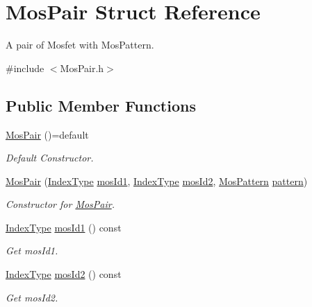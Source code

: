 \hypertarget{classMosPair}{}\section{Mos\+Pair Struct Reference}
\label{classMosPair}


A pair of Mosfet with Mos\+Pattern.  




{\ttfamily \#include $<$Mos\+Pair.\+h$>$}

\subsection*{Public Member Functions}
\begin{DoxyCompactItemize}
\item 
\hyperlink{classMosPair_ad595508e33836b1645f98d85978375c1}{Mos\+Pair} ()=default
\begin{DoxyCompactList}\small\item\em Default Constructor. \end{DoxyCompactList}\item 
\hyperlink{classMosPair_a03e4f764099652cbb0a79f7e0392c315}{Mos\+Pair} (\hyperlink{type_8h_a581e8093e28e7362f2b6937296190676}{Index\+Type} \hyperlink{classMosPair_a324d89c99656159e6882e6f9701f0efe}{mos\+Id1}, \hyperlink{type_8h_a581e8093e28e7362f2b6937296190676}{Index\+Type} \hyperlink{classMosPair_a08f2d371ecad665d546bef76c45e2665}{mos\+Id2}, \hyperlink{type_8h_af19eddb079bfea723256710b029c38e8}{Mos\+Pattern} \hyperlink{classMosPair_a342efc591b339fc9d08ad468d7399dd9}{pattern})
\begin{DoxyCompactList}\small\item\em Constructor for \hyperlink{classMosPair}{Mos\+Pair}. \end{DoxyCompactList}\item 
\hyperlink{type_8h_a581e8093e28e7362f2b6937296190676}{Index\+Type} \hyperlink{classMosPair_a324d89c99656159e6882e6f9701f0efe}{mos\+Id1} () const
\begin{DoxyCompactList}\small\item\em Get mos\+Id1. \end{DoxyCompactList}\item 
\hyperlink{type_8h_a581e8093e28e7362f2b6937296190676}{Index\+Type} \hyperlink{classMosPair_a08f2d371ecad665d546bef76c45e2665}{mos\+Id2} () const
\begin{DoxyCompactList}\small\item\em Get mos\+Id2. \end{DoxyCompactList}\item 

\end{DoxyCompactItemize}
